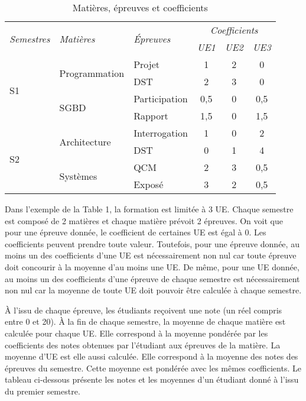 \documentclass[10pt,a4paper,oneside]{article}
\begin{document}
\begin{table}[h]
	\centering
	\begin{tabular}{|l|l|l|c|c|c|} \hline
		 \multirow{2}{*}{\textit{Semestres}} & \multirow{2}{*}{\textit{Matières}} & \multirow{2}{*}{\textit{\'Epreuves}} & \multicolumn{3}{c|}{\textit{Coefficients}} \\ \cline{4-6}
		  &  &  & \textit{UE1} & \textit{UE2} & \textit{UE3} \\ \hline\hline
		\multirow{4}{*}{S1} & \multirow{2}{*}{Programmation} & Projet & 1 & 2 & 0 \\ \cline{3-6}
		 &  & DST & 2 & 3 & 0 \\ \cline{2-6}
		 & \multirow{2}{*}{SGBD} 	& Participation & 0,5 & 0 & 0,5 \\ \cline{3-6}
		 &  & Rapport & 1,5 & 0 & 1,5 \\ \hline \hline
		\multirow{4}{*}{S2} & \multirow{2}{*}{Architecture} & Interrogation & 1 & 0 & 2 \\ \cline{3-6}
		 &  & DST & 0 & 1 & 4 \\ \cline{2-6}
		 & \multirow{2}{*}{Systèmes} & QCM & 2 & 3 & 0,5 \\ \cline{3-6}
		 &  & Exposé & 3 & 2 & 0,5 \\ \hline
	\end{tabular}
	\caption{Matières, épreuves et coefficients}
	\label{tab:MatieresEpreuvesEtCoefficients}
\end{table}

Dans l'exemple de la Table 1, la formation est limitée à 3 UE. Chaque semestre est composé de 2 matières et chaque matière prévoit 2 épreuves. On voit que pour une épreuve donnée, le coefficient de certaines UE est égal à 0. Les coefficients peuvent prendre toute valeur. Toutefois, pour une épreuve donnée, au moins un des coefficients d'une UE est nécessairement non nul car toute épreuve doit concourir à la moyenne d'au moins une UE. De même, pour une UE donnée, au moins un des coefficients d'une épreuve de chaque semestre est nécessairement non nul car la moyenne de toute UE doit pouvoir être calculée à chaque semestre.

\medskip

\`A l'issu de chaque épreuve, les étudiants reçoivent une note (un réel compris entre 0 et 20). \`A la fin de chaque semestre, la moyenne de chaque matière est calculée pour chaque UE. Elle correspond à la moyenne pondérée par les coefficients des notes obtenues par l'étudiant aux épreuves de la matière. La moyenne d'UE est elle aussi calculée. Elle correspond à la moyenne des notes des épreuves du semestre. Cette moyenne est pondérée avec les mêmes coefficients. Le tableau ci-dessous présente les notes et les moyennes d'un étudiant donné à l'issu du premier semestre.
\end{document}
